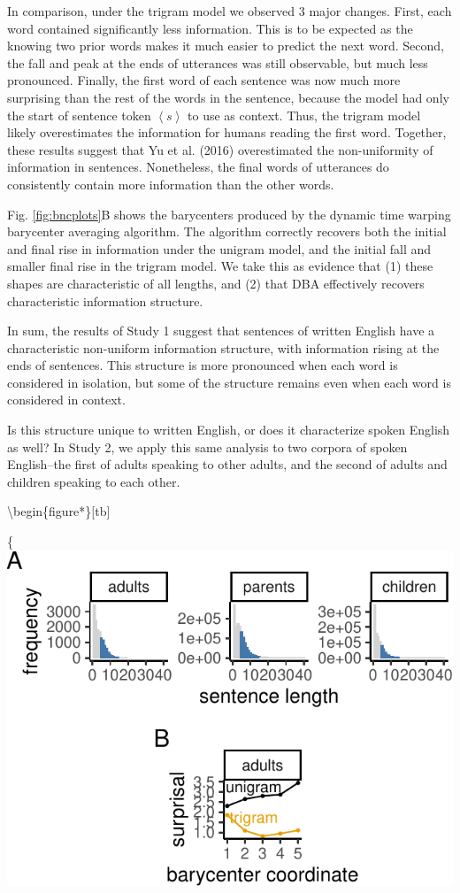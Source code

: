 \documentclass[man,floatsintext]{apa6}
\begin{document}
In comparison, under the trigram model we observed 3 major changes. First, each word contained significantly less information. This is to be expected as the knowing two prior words makes it much easier to predict the next word. Second, the fall and peak at the ends of utterances was still observable, but much less pronounced. Finally, the first word of each sentence was now much more surprising than the rest of the words in the sentence, because the model had only the start of sentence token \(\left<s\right>\) to use as context. Thus, the trigram model likely overestimates the information for humans reading the first word. Together, these results suggest that Yu et al. (2016) overestimated the non-uniformity of information in sentences. Nonetheless, the final words of utterances do consistently contain more information than the other words.

Fig. \ref{fig:bncplots}B shows the barycenters produced by the dynamic time warping barycenter averaging algorithm. The algorithm correctly recovers both the initial and final rise in information under the unigram model, and the initial fall and smaller final rise in the trigram model. We take this as evidence that (1) these shapes are characteristic of all lengths, and (2) that DBA effectively recovers characteristic information structure.

In sum, the results of Study 1 suggest that sentences of written English have a characteristic non-uniform information structure, with information rising at the ends of sentences. This structure is more pronounced when each word is considered in isolation, but some of the structure remains even when each word is considered in context.

Is this structure unique to written English, or does it characterize spoken English as well? In Study 2, we apply this same analysis to two corpora of spoken English--the first of adults speaking to other adults, and the second of adults and children speaking to each other.

\textbackslash{}begin\{figure*\}{[}tb{]}

\{\centering \includegraphics{figs/spoken_figs-1}
\end{document}
